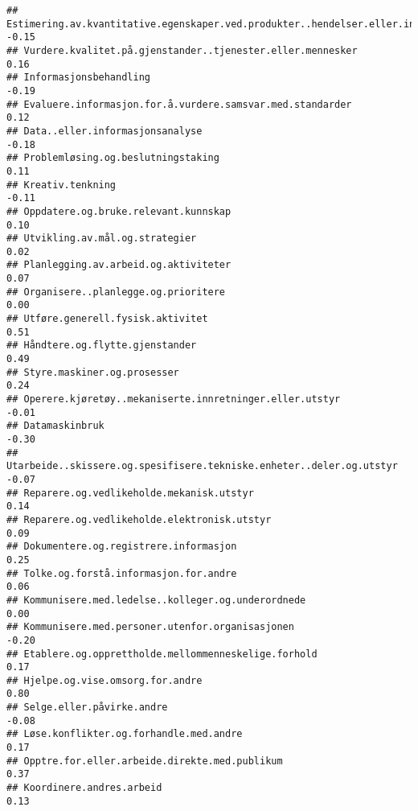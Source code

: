 \documentclass[
]{article}
\begin{document}
\begin{verbatim}
## Estimering.av.kvantitative.egenskaper.ved.produkter..hendelser.eller.informasjon -0.15
## Vurdere.kvalitet.på.gjenstander..tjenester.eller.mennesker                        0.16
## Informasjonsbehandling                                                           -0.19
## Evaluere.informasjon.for.å.vurdere.samsvar.med.standarder                         0.12
## Data..eller.informasjonsanalyse                                                  -0.18
## Problemløsing.og.beslutningstaking                                                0.11
## Kreativ.tenkning                                                                 -0.11
## Oppdatere.og.bruke.relevant.kunnskap                                              0.10
## Utvikling.av.mål.og.strategier                                                    0.02
## Planlegging.av.arbeid.og.aktiviteter                                              0.07
## Organisere..planlegge.og.prioritere                                               0.00
## Utføre.generell.fysisk.aktivitet                                                  0.51
## Håndtere.og.flytte.gjenstander                                                    0.49
## Styre.maskiner.og.prosesser                                                       0.24
## Operere.kjøretøy..mekaniserte.innretninger.eller.utstyr                          -0.01
## Datamaskinbruk                                                                   -0.30
## Utarbeide..skissere.og.spesifisere.tekniske.enheter..deler.og.utstyr             -0.07
## Reparere.og.vedlikeholde.mekanisk.utstyr                                          0.14
## Reparere.og.vedlikeholde.elektronisk.utstyr                                       0.09
## Dokumentere.og.registrere.informasjon                                             0.25
## Tolke.og.forstå.informasjon.for.andre                                             0.06
## Kommunisere.med.ledelse..kolleger.og.underordnede                                 0.00
## Kommunisere.med.personer.utenfor.organisasjonen                                  -0.20
## Etablere.og.opprettholde.mellommenneskelige.forhold                               0.17
## Hjelpe.og.vise.omsorg.for.andre                                                   0.80
## Selge.eller.påvirke.andre                                                        -0.08
## Løse.konflikter.og.forhandle.med.andre                                            0.17
## Opptre.for.eller.arbeide.direkte.med.publikum                                     0.37
## Koordinere.andres.arbeid                                                          0.13

\end{verbatim}
\end{document}
